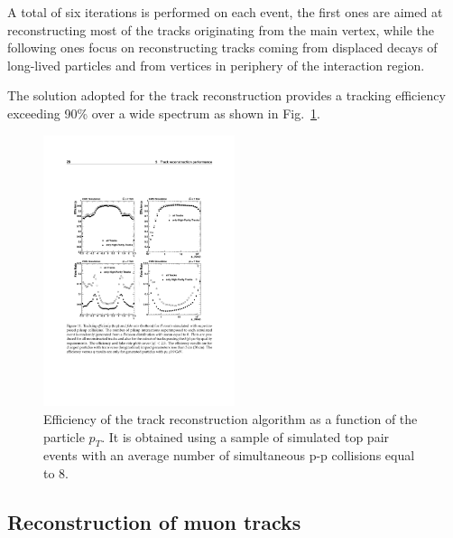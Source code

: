 A total of six iterations is performed on each event, the first ones are aimed at reconstructing most of the tracks originating from the main vertex, while the following ones focus on reconstructing tracks coming from displaced decays of long-lived particles and from vertices in periphery of the interaction region.

The solution adopted for the track reconstruction provides a tracking efficiency exceeding 90\% over a wide \pT spectrum as shown in Fig.~\ref{fig:tracking_eff}.

\begin{figure}[h!]
\begin{center}
\includegraphics[width=0.5\textwidth]{3_Evt_Reconstruction/pics/trackeff.pdf}
\caption{Efficiency of the track reconstruction algorithm as a function of the particle $p_T$. It is obtained using a sample of simulated top pair events with an average number of simultaneous p-p collisions equal to 8.  
\label{fig:tracking_eff}}
\end{center}
\end{figure}


\subsection{Reconstruction of muon tracks} 

